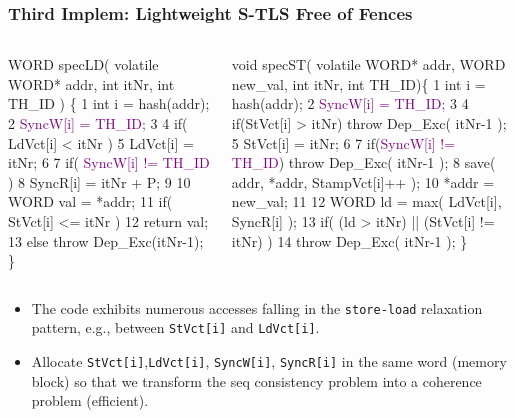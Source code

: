 \documentclass{beamer}
\newcommand{\purple}[1]{\textcolor{Purple}{{#1}}}
\newcommand{\emp}[1]{\textcolor{DikuRed}{ #1}}
\newcommand{\emphh}[1]{\textcolor{CosGreen}{ #1}}
\begin{document}
\begin{frame}[fragile,t]
  \frametitle{Third Implem: Lightweight S-TLS Free of Fences}

\begin{columns}
\begin{colorcode}
WORD specLD( volatile WORD* 
addr, int itNr, int TH_ID ) \{ 
1 int i = hash(addr); 
2 \purple{SyncW[i] = TH_ID;} 
3 
4 if( LdVct[i] < itNr )
5     LdVct[i] = itNr; 
6 
7 if( \purple{SyncW[i] != TH_ID} ) 
8   \emp{SyncR[i] = itNr + P;} 
9 
10 WORD val = *addr; 
11 if( StVct[i] <= itNr ) 
12      return val;
13 else throw Dep_Exc(itNr-1);
\} 
\end{colorcode}
\begin{colorcode}
void specST( volatile WORD* addr,
            WORD new_val, int itNr, int TH_ID)\{
1  int i = hash(addr);
2  \purple{SyncW[i] = TH_ID;}
3
4  if(StVct[i] > itNr) throw Dep_Exc( itNr-1 );
5  StVct[i] = itNr;
6
7  if(\purple{SyncW[i] != TH_ID}) \alert{throw Dep_Exc( itNr-1 );}
8  save( addr, *addr, StampVct[i]++ );
10 *addr = new_val;
11
12 WORD ld = \emp{max( LdVct[i], \emp{SyncR[i]} );}
13 if( (\alert{ld > itNr}) || (StVct[i] != itNr) )
14 throw Dep_Exc( itNr-1 ); 
\}
\end{colorcode}
\end{columns}
\medskip\pause

        \begin{itemize}
            \item The code exhibits numerous accesses falling in the
                    {\tt store-load} relaxation pattern,  e.g., 
                    between {\tt StVct[i]} and {\tt LdVct[i]}.\pause
            \item \emphh{Allocate {\tt StVct[i]},{\tt LdVct[i]}, {\tt SyncW[i]},
                    {\tt SyncR[i]} in the same word (memory block) so
                    that we transform the seq consistency problem into a 
                    coherence problem (efficient).}
        \end{itemize}
\end{frame}
\end{document}
